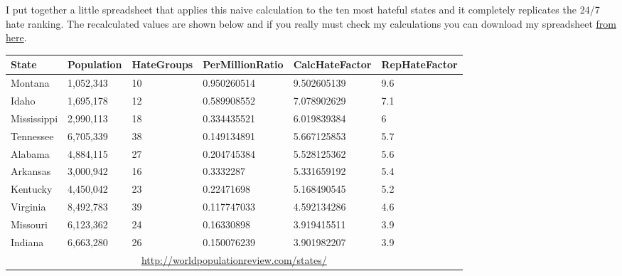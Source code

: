 I put together a little spreadsheet that applies this naive calculation
to the ten most hateful states and it completely replicates the 24/7
hate ranking. The recalculated values are shown below and if you really
must check my calculations you can download my spreadsheet
\href{https://github.com/bakerjd99/Analyze-the-Data-not-the-Drivel/blob/5381f7a91b7614b0de1cc5343eb097e20653de64/wp2latex/inclusions/hfc.xlsx}{from
here}.
\scriptsize
\begin{center}
\begin{tabular}{|l|l|l|l|l|l|} \hline
\textbf{State} & \textbf{Population} & \textbf{HateGroups} & \textbf{PerMillionRatio} & \textbf{CalcHateFactor} & \textbf{RepHateFactor} \\ \hline
Montana	       & 1,052,343           & 10                  & 0.950260514              & 9.502605139             & 9.6 \\ \hline
Idaho	       & 1,695,178           & 12                  & 0.589908552              & 7.078902629             & 7.1 \\ \hline
Mississippi	   & 2,990,113           & 18                  & 0.334435521              & 6.019839384             & 6   \\ \hline
Tennessee	   & 6,705,339           & 38                  & 0.149134891              & 5.667125853             & 5.7 \\ \hline
Alabama	       & 4,884,115           & 27                  & 0.204745384              & 5.528125362             & 5.6 \\ \hline
Arkansas	   & 3,000,942           & 16                  & 0.3332287                & 5.331659192             & 5.4 \\ \hline
Kentucky	   & 4,450,042           & 23                  & 0.22471698               & 5.168490545             & 5.2 \\ \hline
Virginia	   & 8,492,783           & 39                  & 0.117747033              & 4.592134286             & 4.6 \\ \hline
Missouri	   & 6,123,362           & 24                  & 0.16330898               & 3.919415511             & 3.9 \\ \hline
Indiana	       & 6,663,280           & 26                  & 0.150076239              & 3.901982207             & 3.9 \\ \hline
\multicolumn{6}{c}{\href{http://worldpopulationreview.com/states/}{http://worldpopulationreview.com/states/}}
\end{tabular}
\end{center}
\normalsize


